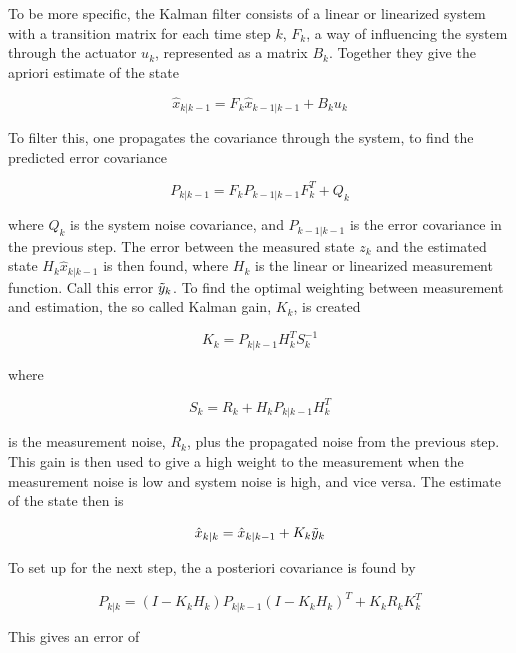 To be more specific, the Kalman filter consists of a linear or linearized system with a transition matrix for each time step $k$, $F_{k}$, a way of influencing the system through the actuator $u_k$, represented as a matrix $B_{k}$. Together they give the apriori estimate of the state

\begin{equation}
    \hat{x}_{k|k-1} = F_k\hat{x}_{k-1|k-1} + B_k u_k
\end{equation}

To filter this, one propagates the covariance through the system, to find the predicted error covariance

\begin{equation}
    P_{k|k-1} = F_k P_{k-1|k-1} F^T_{k} + Q_k
\end{equation}

where $Q_k$ is the system noise covariance, and $P_{k-1|k-1}$ is the error covariance in the previous step. The error between the measured state $z_k$ and the estimated state $H_k \hat{x}_{k|k-1}$ is then found, where $H_k$ is the linear or linearized measurement function. Call this error $\Tilde{y}_k$. To find the optimal weighting between measurement and estimation, the so called Kalman gain, $K_k$, is created

\begin{equation}
    K_k = P_{k|k-1}H^T_kS^{-1}_k
\end{equation}

where 

\begin{equation}
    S_k = R_k + H_kP_{k|k-1}H^T_k
\end{equation}

is the measurement noise, $R_k$, plus the propagated noise from the previous step. This gain is then used to give a high weight to the measurement when the measurement noise is low and system noise is high, and vice versa. The estimate of the state then is

\begin{equation}
    \hat{x}_{k|k} = \hat{x}_{k|k-1} + K_k\Tilde{y}_k
\end{equation}

To set up for the next step, the a posteriori covariance is found by

\begin{equation}
    P_{k|k} = (I-K_kH_k)P_{k|k-1}(I-K_kH_k)^T + K_kR_kK^T_k
\end{equation}

This gives an error of 

